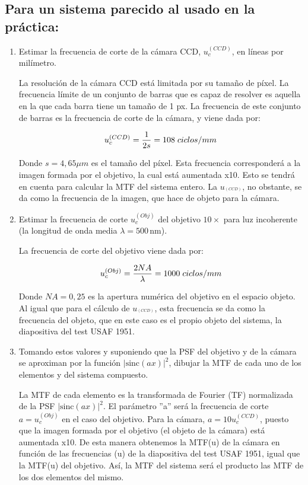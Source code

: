 \documentclass{./packages/optica-article}
\newcommand{\sinc}{\textrm{sinc}}
\begin{document}
\subsection{Para un sistema parecido al usado en la práctica:}\label{sec:cuestion:mtf}
	\begin{enumerate}
		\item Estimar la frecuencia de corte de la cámara CCD, $u_{c}^{(CCD)}$, en líneas por milímetro.
		
	    La resolución de la cámara CCD está limitada por su tamaño de píxel. La frecuencia límite de un conjunto de barras que es capaz de resolver es aquella en la que cada barra tiene un tamaño de 1 px. La frecuencia de este conjunto de barras es la frecuencia de corte de la cámara, y viene dada por:
	    
	    \begin{equation}
	        u_c^{(CCD)} = \frac{1}{2s} = 108 \flatfrac{ciclos}{mm}
	    \end{equation}
		
		Donde $s=4,65 \mu m$ es el tamaño del píxel. Esta frecuencia corresponderá a la imagen formada por el objetivo, la cual está aumentada x10. Esto se tendrá en cuenta para calcular la MTF del sistema entero. La $u_^{(CCD)}$, no obstante, se da como la frecuencia de la imagen, que hace de objeto para la cámara.
		
		\item Estimar la frecuencia de corte $u_{c}^{(Obj)}$ del objetivo $10\times$ para luz incoherente (la longitud de onda media $\lambda=500\,\unit{\nano\metre}$).
		
		La frecuencia de corte del objetivo viene dada por:
		
		\begin{equation}
		    u_c^{(Obj)} = \frac{2 NA}{\lambda} = 1000 \flatfrac{ciclos}{mm}
		\end{equation}
		
		Donde $NA=0,25$ es la apertura numérica del objetivo en el espacio objeto. Al igual que para el cálculo de $u_^{(CCD)}$, esta frecuencia se da como la frecuencia del objeto, que en este caso es el propio objeto del sistema, la diapositiva del test USAF 1951.
		
		\item Tomando estos valores y suponiendo que la PSF del objetivo y de la cámara se aproximan por la función $|\sinc(ax)|^2$, dibujar la MTF de cada uno de los elementos y del sistema compuesto.
		
		La MTF de cada elemento es la transformada de Fourier (TF) normalizada de la PSF $|\sinc(ax)|^2$. El parámetro ''a'' será la frecuencia de corte $a=u_c^{(Obj)}$ en el caso del objetivo. Para la cámara, $a=10 u_c^{(CCD)}$, puesto que la imagen formada por el objetivo (el objeto de la cámara) está aumentada x10. De esta manera obtenemos la MTF(u) de la cámara en función de las frecuencias (u) de la diapositiva del test USAF 1951, igual que la MTF(u) del objetivo. Así, la MTF del sistema será el producto las MTF de los dos elementos del mismo. 
		

\end{enumerate}
\end{document}
